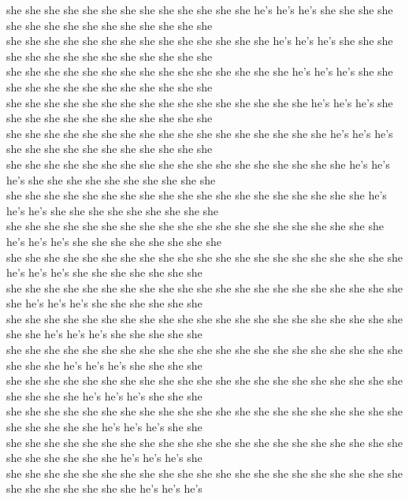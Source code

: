 she she she she she she she she she she she she she he's he's he's she she she she she she she she she she she she she she she\\
she she she she she she she she she she she she she she he's he's he's she she she she she she she she she she she she she she\\
she she she she she she she she she she she she she she she he's he's he's she she she she she she she she she she she she she\\
she she she she she she she she she she she she she she she she he's he's he's she she she she she she she she she she she she\\
she she she she she she she she she she she she she she she she she he's he's he's she she she she she she she she she she she\\
she she she she she she she she she she she she she she she she she she he's he's he's she she she she she she she she she she\\
she she she she she she she she she she she she she she she she she she she he's he's he's she she she she she she she she she\\
she she she she she she she she she she she she she she she she she she she she he's he's he's she she she she she she she she\\
she she she she she she she she she she she she she she she she she she she she she he's he's he's she she she she she she she\\
she she she she she she she she she she she she she she she she she she she she she she he's he's he's she she she she she she\\
she she she she she she she she she she she she she she she she she she she she she she she he's he's he's she she she she she\\
she she she she she she she she she she she she she she she she she she she she she she she she he's he's he's she she she she\\
she she she she she she she she she she she she she she she she she she she she she she she she she he's he's he's she she she\\
she she she she she she she she she she she she she she she she she she she she she she she she she she he's he's he's she she\\
she she she she she she she she she she she she she she she she she she she she she she she she she she she he's he's he's she\\
she she she she she she she she she she she she she she she she she she she she she she she she she she she she he's he's he's\\
